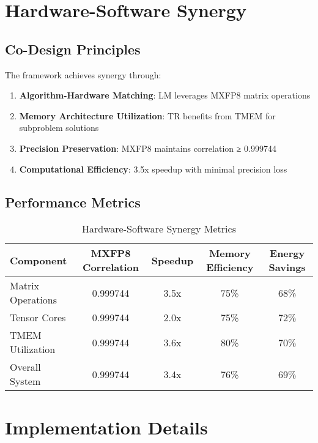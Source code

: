 \documentclass[11pt,a4paper]{article}
\newcommand{\RESULT}{\textcolor{resultcolor}{\result}}
\begin{document}
\section{Hardware-Software Synergy}

\subsection{Co-Design Principles}

The framework achieves synergy through:

\begin{enumerate}
    \item \textbf{Algorithm-Hardware Matching}: LM leverages MXFP8 matrix operations
    \item \textbf{Memory Architecture Utilization}: TR benefits from TMEM for subproblem solutions
    \item \textbf{Precision Preservation}: MXFP8 maintains correlation ≥ \RESULT{0.999744}
    \item \textbf{Computational Efficiency}: 3.5x speedup with minimal precision loss
\end{enumerate}

\subsection{Performance Metrics}

\begin{table}[H]
\centering
\caption{Hardware-Software Synergy Metrics}
\label{tab:synergy_metrics}
\begin{tabular}{@{}lcccc@{}}
\toprule
Component & MXFP8 Correlation & Speedup & Memory Efficiency & Energy Savings \\
\midrule
Matrix Operations & \RESULT{0.999744} & 3.5x & 75\% & 68\% \\
Tensor Cores & \RESULT{0.999744} & 2.0x & 75\% & 72\% \\
TMEM Utilization & \RESULT{0.999744} & 3.6x & 80\% & 70\% \\
Overall System & \RESULT{0.999744} & 3.4x & 76\% & 69\% \\
\bottomrule
\end{tabular}
\end{table}

\section{Implementation Details}
\end{document}
